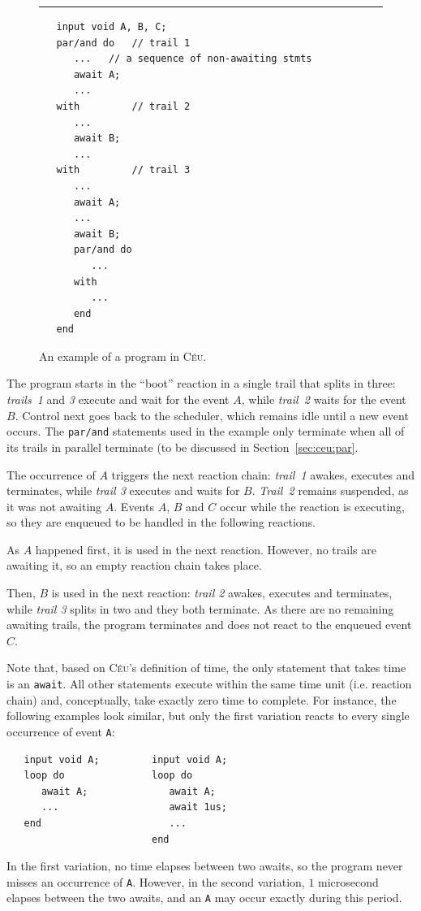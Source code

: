 \documentclass{sigplan-proc}
\newcommand{\2}{\;\;}
\newcommand{\5}{\;\;\;\;\;}
\newcommand{\CEU}{\textsc{C\'{e}u}}
\newcommand{\code}[1] {{\small{\texttt{#1}}}}
\begin{document}
\begin{figure}[t]
\rule{8.5cm}{0.37pt}
{\small
\begin{verbatim}
   input void A, B, C;
   par/and do   // trail 1
      ...   // a sequence of non-awaiting stmts
      await A;
      ...
   with         // trail 2
      ...
      await B;
      ...
   with         // trail 3
      ...
      await A;
      ...
      await B;
      par/and do
         ...
      with
         ...
      end
   end
\end{verbatim}
}
\caption{ An example of a program in \CEU{}.
\label{lst:ceu:2}
}
\end{figure}
The program starts in the ``boot'' reaction in a single trail that splits in 
three: \emph{trails~1} and \emph{3} execute and wait for the event $A$, while 
\emph{trail~2} waits for the event $B$.
Control next goes back to the scheduler, which remains idle until a new event 
occurs.
The \code{par/and} statements used in the example only terminate when all of 
its trails in parallel terminate (to be discussed in Section~\ref{sec:ceu:par}.

The occurrence of $A$ triggers the next reaction chain: \emph{trail~1} awakes, 
executes and terminates, while \emph{trail 3} executes and waits for $B$.
\emph{Trail~2} remains suspended, as it was not awaiting $A$.
Events $A$, $B$ and $C$ occur while the reaction is executing, so they are 
enqueued to be handled in the following reactions.

As $A$ happened first, it is used in the next reaction.
However, no trails are awaiting it, so an empty reaction chain takes place.

Then, $B$ is used in the next reaction: \emph{trail 2} awakes, executes and 
terminates, while \emph{trail 3} splits in two and they both terminate.
As there are no remaining awaiting trails, the program terminates and does not 
react to the enqueued event $C$.

Note that, based on \CEU's definition of time, the only statement that takes 
time is an \code{await}.
All other statements execute within the same time unit (i.e. reaction chain) 
and, conceptually, take exactly zero time to complete.
For instance, the following examples look similar, but only the first variation 
reacts to every single occurrence of event \code{A}:
{\small
\begin{verbatim}
   input void A;         input void A;
   loop do               loop do
      await A;              await A;
      ...                   await 1us;
   end                      ...
                         end
\end{verbatim}
}
In the first variation, no time elapses between two awaits, so the program 
never misses an occurrence of \code{A}.
However, in the second variation, $1$ microsecond elapses between the two 
awaits, and an \code{A} may occur exactly during this period.
\end{document}
